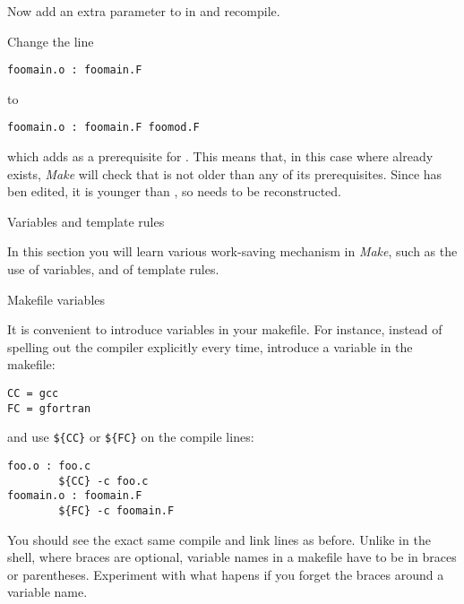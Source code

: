 Now add an extra
parameter to  in  and recompile. 


Change the line
\begin{verbatim}
foomain.o : foomain.F
\end{verbatim}
to
\begin{verbatim}
foomain.o : foomain.F foomod.F
\end{verbatim}
which adds  as a prerequisite for . This
means that, in this case where  already exists,
\emph{Make} will check that  is not older than any of its
prerequisites. Since  has ben edited, it is younger than
, so  needs to be reconstructed.


 {Variables and template rules}

\begin{purpose}
  In this section you will learn various work-saving mechanism in
  \emph{Make}, such as the use of variables, and of template rules.
\end{purpose}

 {Makefile variables}

It is convenient to introduce variables in your makefile.
For instance, 
instead of spelling out the compiler explicitly every time, introduce a
variable in the makefile:
\begin{verbatim}
CC = gcc
FC = gfortran
\end{verbatim}
and use \verb+${CC}+ or \verb+${FC}+ on the compile lines:
\begin{verbatim}
foo.o : foo.c
        ${CC} -c foo.c
foomain.o : foomain.F
        ${FC} -c foomain.F
\end{verbatim}
  {You should see the exact same compile and link lines as before.}
  {Unlike in the shell, where braces are optional, variable names in a
    makefile have to be in
    braces or parentheses. Experiment with what hapens if you forget
    the braces around a variable name.}

